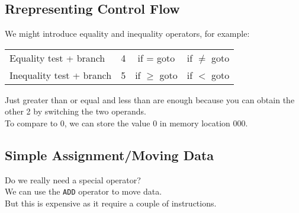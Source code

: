     \subsection{Rrepresenting Control Flow}
    We might introduce equality and inequality operators, for example:
    \begin{center}
        \begin{tabular}{l|ccc}
            \midrule
            Equality test + branch & 4 & if = goto & if $\neq$ goto\\
            Inequality test + branch & 5 & if $\geq$ goto & if $<$ goto\\
            \bottomrule            
        \end{tabular}
    \end{center}   
    Just greater than or equal and less than are enough because you can obtain the other 2 by switching the two operands.\\
    To compare to 0, we can store the value 0 in memory location 000.

    \subsection{Simple Assignment/Moving Data}
    Do we really need a special operator?\\
    We can use the \texttt{ADD} operator to move data.\\
    But this is expensive as it require a couple of instructions.\\
    

    

